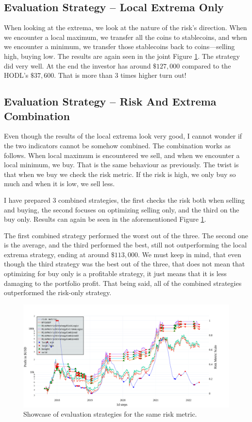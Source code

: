 \subsection*{Evaluation Strategy -- Local Extrema Only}
\label{subsection-local-extrema}
When looking at the extrema, we look at the nature of the risk's direction. When we encounter a local maximum, we transfer all the coins to stablecoins, and when we encounter a minimum, we transfer those stablecoins back to coins---selling high, buying low. The results are again seen in the joint Figure \ref{figure-combined-riskmetric}. The strategy did very well. At the end the investor has around $\$127,000$ compared to the HODL's $\$37,600$. That is more than 3 times higher turn out!

\subsection*{Evaluation Strategy -- Risk And Extrema Combination}
Even though the results of the local extrema look very good, I cannot wonder if the two indicators cannot be somehow combined. The combination works as follows. When local maximum is encountered we sell, and when we encounter a local minimum, we buy. That is the same behaviour as previously. The twist is that when we buy we check the risk metric. If the risk is high, we only buy so much and when it is low, we sell less.

I have prepared 3 combined strategies, the first checks the risk both when selling and buying, the second focuses on optimizing selling only, and the third on the buy only. Results can again be seen in the aforementioned Figure \ref{figure-combined-riskmetric}.

The first combined strategy performed the worst out of the three. The second one is the average, and the third performed the best, still not outperforming the local extrema strategy, ending at around $\$113,000$. We must keep in mind, that even though the third strategy was the best out of the three, that does not mean that optimizing for buy only is a profitable strategy, it just means that it is less damaging to the portfolio profit. That being said, all of the combined strategies outperformed the risk-only strategy.

\begin{figure}[!hbt]
    \centering
    \includegraphics[width=\columnwidth]{figures/combined-riskmetric.pdf}
    \caption{Showcase of evaluation strategies for the same risk metric.}
    \label{figure-combined-riskmetric}
\end{figure}

